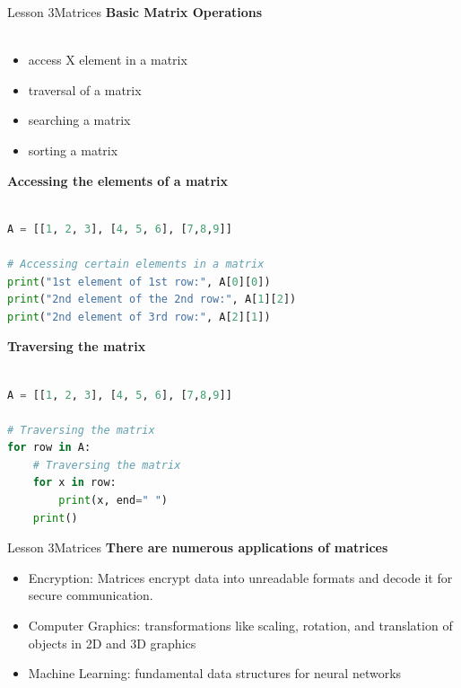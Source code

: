 \documentclass[aspectratio=1610]{beamer}
\begin{document}
\begin{frame}{Lesson 3}{Matrices}
\LARGE
\textbf{Basic Matrix Operations}\\~\\
\begin{itemize}
	\item access X element in a matrix
	\item traversal of a matrix
	\item searching a matrix
	\item sorting a matrix
\end{itemize}
\end{frame}




\begin{frame}[fragile]
\LARGE
\textbf{Accessing the elements of a matrix}\\~\\
\Large
\begin{lstlisting}[language=Python]
A = [[1, 2, 3], [4, 5, 6], [7,8,9]]

# Accessing certain elements in a matrix
print("1st element of 1st row:", A[0][0])
print("2nd element of the 2nd row:", A[1][2])
print("2nd element of 3rd row:", A[2][1])
\end{lstlisting}
\end{frame}



\begin{frame}[fragile]
\LARGE
\textbf{Traversing the matrix}\\~\\
\Large
\begin{lstlisting}[language=Python]
A = [[1, 2, 3], [4, 5, 6], [7,8,9]]

# Traversing the matrix
for row in A:
    # Traversing the matrix
    for x in row:
        print(x, end=" ")
    print()
\end{lstlisting}
\end{frame}



\begin{frame}{Lesson 3}{Matrices}
\LARGE
\textbf{There are numerous applications of matrices}\\
\begin{itemize}
    \item Encryption: Matrices encrypt data into unreadable formats and decode it for secure communication. 
    \item Computer Graphics: transformations like scaling, rotation, and translation of objects in 2D and 3D graphics
    \item Machine Learning: fundamental data structures for neural networks  
\end{itemize}
\end{frame}
\end{document}
